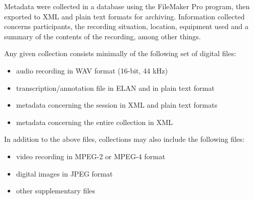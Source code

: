 Metadata were collected in a database using the FileMaker Pro program, then exported to XML and plain text formats for archiving. Information collected concerns participants, the recording situation, location, equipment used and a summary of the contents of the recording, among other things.

\nopagebreak[4]
Any given collection consists minimally of the following set of digital files: %
\begin{itemize}
\item{audio recording in WAV format (16-bit, 44 kHz)}
\item{transcription/annotation file in ELAN and in plain text format}
\item{metadata concerning the session in XML and plain text formats}
\item{metadata concerning the entire collection in XML}
\end{itemize}
In addition to the above files, collections may also include the following files:
\begin{itemize}
\item{video recording in MPEG-2 or MPEG-4 format}
\item{digital images in JPEG format}
\item{other supplementary files}
\end{itemize}


